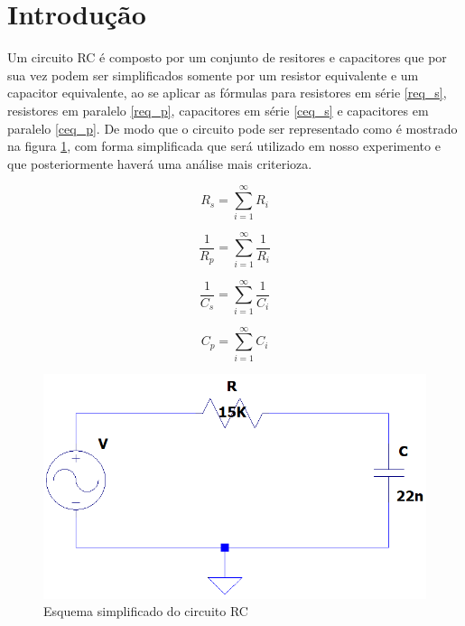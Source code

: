 \documentclass[a4paper,12pt,onecolumn]{article}
\numberwithin{equation}{section}
\numberwithin{figure}{section}
\begin{document}
\newpage
\begin{center}
\tableofcontents
\end{center}

\newpage
\section{Introdução}
Um circuito RC é composto por um conjunto de resitores e capacitores que por sua vez podem ser simplificados somente por um resistor equivalente e um capacitor equivalente, ao se aplicar as fórmulas para resistores em série \ref{req_s}, resistores em paralelo \ref{req_p}, capacitores em série \ref{ceq_s} e capacitores em paralelo \ref{ceq_p}. De modo que o circuito pode ser representado como é mostrado na figura \ref{c1}, com forma simplificada que será utilizado em nosso experimento e que posteriormente haverá uma análise mais criterioza.

\begin{equation}
R_{s} = \sum_{i=1}^{\infty} R_{i}
\label{req_s}
\end{equation}

\vspace{0.5cm}

\begin{equation}
\dfrac{1}{R_{p}} = \sum_{i=1}^{\infty} \dfrac{1}{R_{i}}
\label{req_p}
\end{equation}

\vspace{0.5cm}

\begin{equation}
\dfrac{1}{C_{s}} = \sum_{i=1}^{\infty} \dfrac{1}{C_{i}}
\label{ceq_s}
\end{equation}

\vspace{0.5cm}

\begin{equation}
C_{p} = \sum_{i=1}^{\infty} C_{i}
\label{ceq_p}
\end{equation}

\vspace{0.5cm}

\begin{figure}[H]
\centering
\includegraphics[scale=0.5]{c1.png}
\caption{Esquema simplificado do circuito RC }
\label{c1}
\end{figure}
\end{document}
